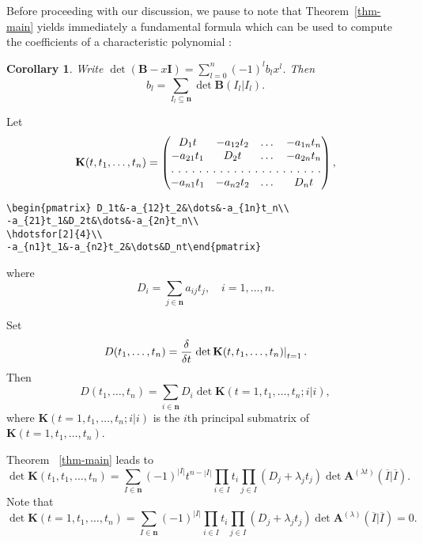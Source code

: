 \documentclass{article}
\newtheorem{cor}[thm]{Corollary}
\theoremstyle{definition}
\theoremstyle{remark}
\newcommand{\thmref}[1]{Theorem~\ref{#1}}
\newcommand{\eval}[2][\right]{\relax
  \ifx#1\right\relax \left.\fi#2#1\rvert}
\newcommand{\envert}[1]{\left\lvert#1\right\rvert}
\begin{document}
Before proceeding with our discussion, we pause to note that
\thmref{thm-main} yields immediately a fundamental formula which can be
used to compute the coefficients of a characteristic polynomial
\cite{mami:matrixth}:
\begin{cor}\label{BI}
Write $\det(\mathbf{B}-x\mathbf{I})=\sum^n_{l =0}(-1)
^l b_l x^l $. Then
\begin{equation}\label{bl-sum}
b_l =\sum_{I_l \subseteq\mathbf{n}}\det\mathbf{B}(I_l |I_l ).
\end{equation}
\end{cor}
Let
\begin{equation}
\mathbf{K}(t,t_1,\dots,t_n)
=\begin{pmatrix} D_1t&-a_{12}t_2&\dots&-a_{1n}t_n\\
-a_{21}t_1&D_2t&\dots&-a_{2n}t_n\\
\hdotsfor[2]{4}\\
-a_{n1}t_1&-a_{n2}t_2&\dots&D_nt\end{pmatrix},
\end{equation}
\begin{verbatim}
\begin{pmatrix} D_1t&-a_{12}t_2&\dots&-a_{1n}t_n\\
-a_{21}t_1&D_2t&\dots&-a_{2n}t_n\\
\hdotsfor[2]{4}\\
-a_{n1}t_1&-a_{n2}t_2&\dots&D_nt\end{pmatrix}
\end{verbatim}
where
\begin{equation}
D_i=\sum_{j\in\mathbf{n}}a_{ij}t_j,\quad i=1,\dots,n.
\end{equation}

Set
\begin{equation*}
D(t_1,\dots,t_n)=\frac{\delta}{\delta t}\eval{\det\mathbf{K}(t,t_1,\dots,t_n)
}_{t=1}.
\end{equation*}
Then
\begin{equation}\label{sum-Di}
D(t_1,\dots,t_n)
=\sum_{i\in\mathbf{n}}D_i\det\mathbf{K}(t=1,t_1,\dots,t_n; i|i),
\end{equation}
where $\mathbf{K}(t=1,t_1,\dots,t_n; i|i)$ is the $i$th principal
submatrix of $\mathbf{K}(t=1,t_1,\dots,t_n)$.

Theorem ~\ref{thm-main} leads to
\begin{equation}\label{detK1}
\det\mathbf{K}(t_1,t_1,\dots,t_n)
=\sum_{I\in\mathbf{n}}(-1)^{\envert{I}}t^{n-\envert{I}}
\prod_{i\in I}t_i\prod_{j\in I}(D_j+\lambda_jt_j)\det\mathbf{A}
^{(\lambda t)}(\overline{I}|\overline I).
\end{equation}
Note that
\begin{equation}\label{detK2}
\det\mathbf{K}(t=1,t_1,\dots,t_n)=\sum_{I\in\mathbf{n}}(-1)^{\envert{I}}
\prod_{i\in I}t_i\prod_{j\in I}(D_j+\lambda_jt_j)\det\mathbf{A}
^{(\lambda)}(\overline{I}|\overline{I})=0.
\end{equation}
\end{document}
